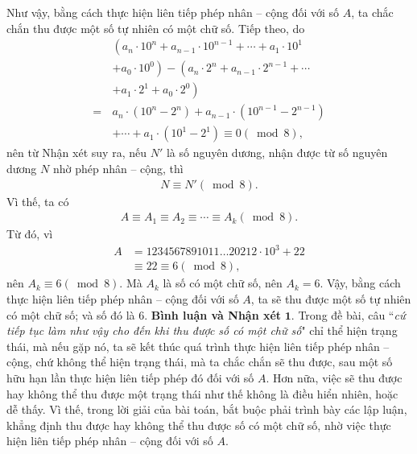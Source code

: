 \begin{multicols}{2}
	\vskip 0.05cm
	Như vậy, bằng cách thực hiện liên tiếp phép nhân -- cộng đối với số $A$, ta chắc chắn thu được một số tự nhiên có một chữ số.
	\vskip 0.05cm
	Tiếp theo, do
	\begin{align*}
			&\left({a_n} \cdot {{10}^n} + {a_{n - 1}} \cdot {{10}^{n - 1}} +  \cdots  + {a_1} \cdot {{10}^1}\right. \\
			&\left.+ {a_0} \cdot {{10}^0} \right) - \left( {a_n} \cdot {2^n} + {a_{n - 1}} \cdot {2^{n - 1}} +  \cdots\right. \\
			&\left.+ {a_1} \cdot {2^1} + {a_0} \cdot {2^0} \right)\\
			=\, &{a_n} \cdot \left( {{{10}^n} - {2^n}} \right) + {a_{n - 1}} \cdot \left( {{{10}^{n - 1}} - {2^{n - 1}}} \right) \\
			&+  \cdots + {a_1} \cdot \left( {{{10}^1} - {2^1}} \right) \equiv 0\left( {\bmod 8} \right),
	\end{align*}
	nên từ Nhận xét suy ra, nếu  $N'$ là số nguyên dương, nhận được từ số nguyên dương $N$ nhờ phép nhân -- cộng, thì
	\begin{align*}
		N \equiv N'\left( {\bmod 8} \right).
	\end{align*}
	Vì thế, ta có
	\begin{align*}
		A \equiv {A_1} \equiv {A_2} \equiv  \cdots  \equiv {A_k}\left( {\bmod 8} \right).
	\end{align*}
	Từ đó, vì
	\begin{align*}
		A &= 1234567891011 \ldots 20212 \cdot {10^3} + 22 \\
		&\equiv 22 \equiv 6\left( {\bmod 8} \right),
	\end{align*}
	nên ${A_k} \equiv 6\left( {\bmod 8} \right)$.  Mà  $A_k$ là số có một chữ số, nên $A_k = 6$.
	\vskip 0.05cm 
	Vậy, bằng cách thực hiện liên tiếp phép nhân -- cộng đối với số $A$, ta sẽ thu được một số tự nhiên có một chữ số; và số đó là $6$.
	\vskip 0.05cm
	\textbf{\color{thachthuctoanhoc}Bình luận và Nhận xét}
	\vskip 0.05cm
	$\pmb{1.}$ Trong đề bài, câu ``\textit{cứ tiếp tục làm như vậy cho đến khi thu được số có một chữ số}" chỉ thể hiện trạng thái, mà nếu gặp nó, ta sẽ kết thúc quá trình thực hiện liên tiếp phép nhân -- cộng, chứ không thể hiện trạng thái, mà ta chắc chắn sẽ thu được, sau một số hữu hạn lần thực hiện liên tiếp phép đó đối với số $A$. Hơn nữa, việc sẽ thu được hay không thể thu được một trạng thái như thế không là điều hiển nhiên, hoặc dễ thấy. Vì thế, trong lời giải của bài toán, bắt buộc phải trình bày các lập luận, khẳng định thu được hay không thể thu được số có một chữ số, nhờ việc thực hiện liên tiếp phép nhân -- cộng đối với số $A$.

\end{multicols}
